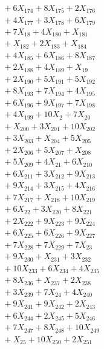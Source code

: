 \documentclass[a4paper,10pt]{article}
\begin{document}
{\begin{align}
&\quad  + 6X_{174} + 8X_{175} + 2X_{176} \\[0.5ex]
&\quad  + 4X_{177} + 3X_{178} + 6X_{179} \\[0.5ex]
&\quad  + 7X_{18} + 4X_{180} + X_{181} \\[0.5ex]
&\quad  + X_{182} + 2X_{183} + X_{184} \\[0.5ex]
&\quad  + 4X_{185} + 6X_{186} + 8X_{187} \\[0.5ex]
&\quad  + 2X_{188} + 4X_{189} + X_{19} \\[0.5ex]
&\quad  + 2X_{190} + 5X_{191} + 5X_{192} \\[0.5ex]
&\quad  + 8X_{193} + 7X_{194} + 4X_{195} \\[0.5ex]
&\quad  + 6X_{196} + 9X_{197} + 7X_{198} \\[0.5ex]
&\quad  + 4X_{199} + 10X_{2} + 7X_{20} \\[0.5ex]
&\quad  + X_{200} + 3X_{201} + 10X_{202} \\[0.5ex]
&\quad  + 3X_{203} + X_{204} + 5X_{205} \\[0.5ex]
&\quad  + 2X_{206} + 5X_{207} + X_{208} \\[0.5ex]
&\quad  + 5X_{209} + 4X_{21} + 6X_{210} \\[0.5ex]
&\quad  + 6X_{211} + 3X_{212} + 9X_{213} \\[0.5ex]
&\quad  + 9X_{214} + 3X_{215} + 4X_{216} \\[0.5ex]
&\quad  + 7X_{217} + X_{218} + 10X_{219} \\[0.5ex]
&\quad  + 6X_{22} + 3X_{220} + 8X_{221} \\[0.5ex]
&\quad  + 2X_{222} + 9X_{223} + 9X_{224} \\[0.5ex]
&\quad  + 6X_{225} + 6X_{226} + 9X_{227} \\[0.5ex]
&\quad  + 7X_{228} + 7X_{229} + 7X_{23} \\[0.5ex]
&\quad  + 9X_{230} + X_{231} + 3X_{232} \\[0.5ex]
&\quad  + 10X_{233} + 6X_{234} + 4X_{235} \\[0.5ex]
&\quad  + 8X_{236} + X_{237} + 2X_{238} \\[0.5ex]
&\quad  + 3X_{239} + 7X_{24} + 4X_{240} \\[0.5ex]
&\quad  + 9X_{241} + 9X_{242} + 2X_{243} \\[0.5ex]
&\quad  + 6X_{244} + 2X_{245} + 5X_{246} \\[0.5ex]
&\quad  + 7X_{247} + 8X_{248} + 10X_{249} \\[0.5ex]
&\quad  + X_{25} + 10X_{250} + 2X_{251} \\[0.5ex]

\end{align}}
\end{document}

